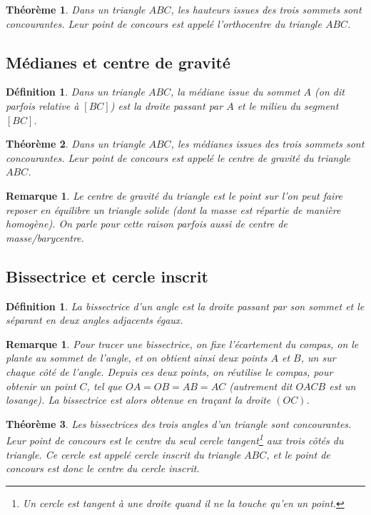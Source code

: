 \documentclass[12 pt]{article}
\theoremstyle{plain}
\newcounter{n}
\numberwithin{n}{section}
\newtheorem{theo}{Théorème}
\newtheorem{df}[n]{Définition}
\newtheorem{rmq}[n]{Remarque}
\begin{document}
\begin{theo}
Dans un triangle $ABC$, les hauteurs issues des trois sommets sont concourantes. Leur point de concours est appelé 
l'\emph{orthocentre} du triangle $ABC$. 
\end{theo}

\subsection{Médianes et centre de gravité}


\begin{df}
Dans un triangle $ABC$, la \emph{médiane issue du sommet $A$} (on dit parfois relative à $[BC]$)
est la droite passant par $A$ et le milieu du segment $[BC]$.
\end{df}

\begin{theo}
Dans un triangle $ABC$, les médianes issues des trois sommets sont concourantes. Leur point de concours est appelé 
le \emph{centre de gravité} du triangle $ABC$. 
\end{theo}

\begin{rmq}
Le centre de gravité du triangle est le point sur l'on peut faire reposer en équilibre un triangle solide (dont la 
masse est répartie de manière homogène). On parle pour cette raison parfois aussi de centre de masse/barycentre.
\end{rmq}


\subsection{Bissectrice et cercle inscrit}

\begin{df}
La \emph{bissectrice} d'un angle est la droite passant par son sommet et le séparant en deux angles adjacents égaux. 
\end{df}

\begin{rmq}
Pour tracer une bissectrice, on fixe l'écartement du compas, on le plante au sommet de l'angle, et on obtient ainsi deux points $A$ et $B$, un sur chaque côté de l'angle. Depuis ces deux points, on réutilise le compas, pour obtenir un 
point $C$, tel que $OA=OB=AB=AC$ (autrement dit $OACB$ est un losange). La bissectrice est alors obtenue en traçant la droite $(OC)$. 
\end{rmq}

\begin{theo}

Les bissectrices des trois angles d'un triangle sont concourantes. Leur point de concours est le centre du seul cercle 
tangent\footnote{Un cercle est \emph{tangent} à une droite quand il ne la touche qu'en un point.} aux trois côtés du triangle. Ce cercle est appelé \emph{cercle inscrit} du triangle $ABC$, et le point de concours est donc le \emph{centre du cercle inscrit}. 
\end{theo}
\end{document}
